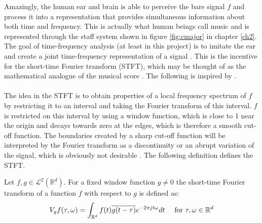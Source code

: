 Amazingly, the human ear and brain is able to perceive the bare signal $f$ and process it into a representation that provides simultaneous information about both time and frequency. This is actually what human beings call music and is represented through the staff system shown in figure \ref{fig:cmajor} in chapter \ref{ch2}. The goal of time-frequency analysis (at least in this project) is to imitate the ear and create a joint time-frequency representation of a signal \cite{page 22, FTFA}. This is the incentive for the short-time Fourier transform (STFT), which may be thought of as the mathematical analogue of the musical score \cite{page 37, FTFA}. The following is inspired by \cite{page 37, FTFA}.
\\ \\
The idea in the STFT is to obtain properties of a local frequency spectrum of $f$ by restricting it to an interval and taking the Fourier transform of this interval. $f$ is restricted on this interval by using a window function, which is close to 1 near the origin and decays towards zero at the edges, which is therefore a smooth cut-off function. The boundaries created by a sharp cut-off function will be interpreted by the Fourier transform as a discontinuity or an abrupt variation of the signal, which is obviously not desirable \cite{Davis}. The following definition defines the STFT.

\begin{definition}
Let $f,g \in \mathcal{L}^2(\mathbb{R}^d)$. For a fixed window function $g \neq 0$ the short-time Fourier transform of a function $f$ with respect to $g$ is defined as:
\begin{align}
V_gf(\tau,\omega) = \int_{\mathbb{R}^d} f(t) \overline{g(t - \tau)} e^{-2\pi j t \omega} dt \quad \textnormal{ for } \tau,\omega \in \mathbb{R}^d
\end{align}
\end{definition}


